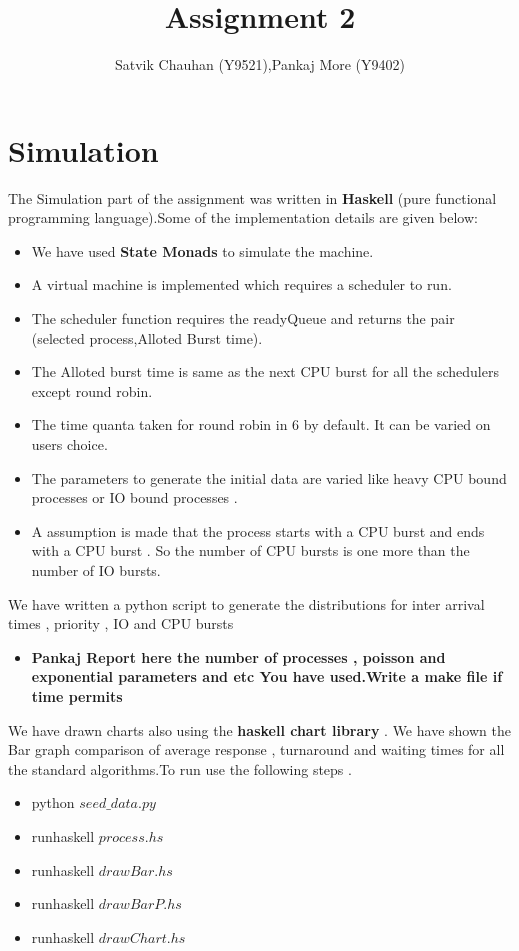 \documentclass{article}
\title{Assignment 2}
\author{Satvik Chauhan (Y9521),Pankaj More (Y9402)}
\date{}
\begin{document}
\maketitle
\section*{Simulation}
The Simulation part of the assignment was written in \textbf{Haskell} (pure functional programming language).Some of the implementation details are given below:
\begin{itemize}
\item We have used \textbf{State Monads} to simulate the machine.
\item A virtual machine is implemented which requires a scheduler to run.
\item The scheduler function requires the readyQueue and returns the pair (selected process,Alloted Burst time).
\item The Alloted burst time is same as the next CPU burst for all the schedulers except round robin.
\item The time quanta taken for round robin in 6 by default. It can be varied on users choice.
\item The parameters to generate the initial data are varied like heavy CPU bound processes or IO bound processes .
\item A assumption is made that the process starts with a CPU burst and ends with a CPU burst . So the number of CPU bursts is one more than the number of IO bursts.
\end{itemize}
We have written a python script to generate the distributions for inter arrival times , priority , IO and CPU bursts
\begin{itemize}
\item \textbf{Pankaj Report here the number of processes , poisson and exponential parameters and etc You have used.Write a make file if time permits}
\end{itemize}
We have drawn charts also using the \textbf{haskell chart library} .
We have shown the Bar graph comparison of average response , turnaround and waiting times for all the standard algorithms.To run use the following steps .
\begin{itemize}
\item python $seed\_data.py$
\item runhaskell $process.hs$
\item runhaskell $drawBar.hs$
\item runhaskell $drawBarP.hs$
\item runhaskell $drawChart.hs$
\end{itemize}
\end{document}
